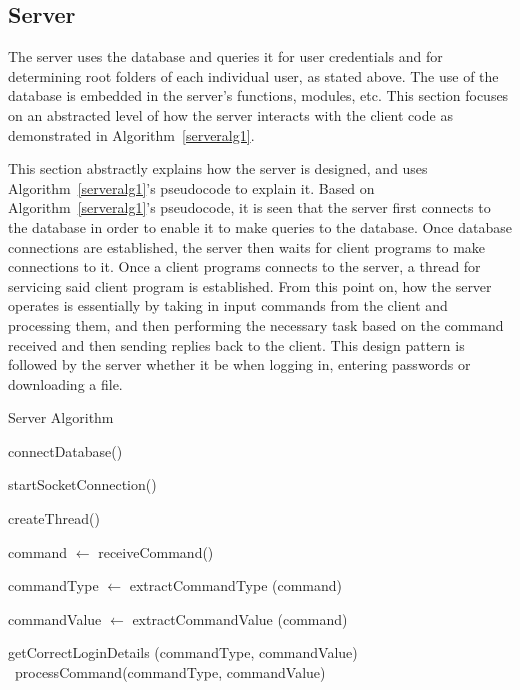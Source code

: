 \documentclass[journal, a4paper]{IEEEtran}
\begin{document}
\subsection{Server}
The server uses the database and queries it for user credentials and for determining root folders of each individual user, as stated above. The use of the database is embedded in the server's functions, modules, etc. This section focuses on an abstracted level of how the server interacts with the client code as demonstrated in Algorithm~\ref{serveralg1}. 

This section abstractly explains how the server is designed, and uses Algorithm~\ref{serveralg1}'s pseudocode to explain it. Based on Algorithm~\ref{serveralg1}'s pseudocode, it is seen that the server first connects to the database in order to enable it to make queries to the database. Once database connections are established, the server then waits for client programs to make connections to it. Once a client programs connects to the server, a thread for servicing said client program is established. From this point on, how the server operates is essentially by taking in input commands from the client and processing them, and then performing the necessary task based on the command received and then sending replies back to the client. This design pattern is followed by the server whether it be when logging in, entering passwords or downloading a file.


	\begin{algorithm}
	\caption{Server Algorithm}\label{serveralg1}
	\begin{algorithmic}[1]
		
		connectDatabase()
		
		startSocketConnection()
		
		 {
		\EndWhile
		
	
		createThread()
		
		command $\gets$ receiveCommand()
		
		commandType $\gets$ extractCommandType (command)
		
		commandValue $\gets$ extractCommandValue (command)
		
			getCorrectLoginDetails (commandType, commandValue)
		\Else~processCommand(commandType, commandValue)
		\EndIf
		
		}
		 
		\EndProcedure
	\end{algorithmic}
\end{algorithm}
\end{document}
